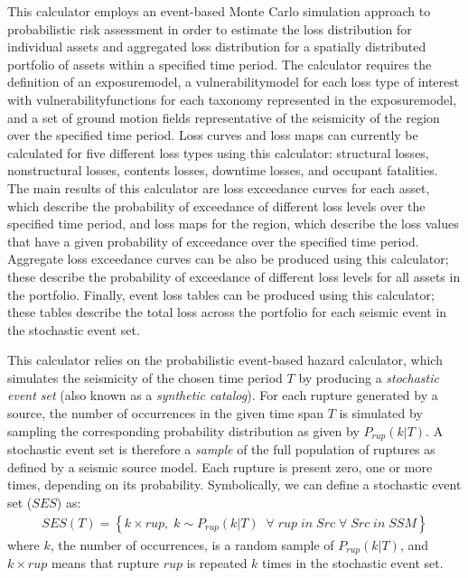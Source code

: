 This calculator employs an event-based Monte Carlo simulation approach to
probabilistic risk assessment in order to estimate the loss distribution for
individual assets and aggregated loss distribution for a spatially distributed
portfolio of assets within a specified time period. The calculator requires
the definition of an \gls{exposuremodel}, a \gls{vulnerabilitymodel} for each loss type
of interest with \glspl{vulnerabilityfunction} for each taxonomy represented in the
\gls{exposuremodel}, and a set of ground motion fields representative of the
seismicity of the region over the specified time period. Loss curves and loss
maps can currently be calculated for five different loss types using this
calculator: structural losses, nonstructural losses, contents losses, downtime
losses, and occupant fatalities. The main results of this calculator are loss
exceedance curves for each asset, which describe the probability of exceedance
of different loss levels over the specified time period, and loss maps for the
region, which describe the loss values that have a given probability of
exceedance over the specified time period. Aggregate loss exceedance curves
can be also be produced using this calculator; these describe the probability
of exceedance of different loss levels for all assets in the portfolio. Finally,
event loss tables can be produced using this calculator; these tables describe
the total loss across the portfolio for each seismic event in the stochastic
event set.

This calculator relies on the probabilistic event-based hazard calculator,
which simulates the seismicity of the chosen time period $T$ by producing a
\textit{stochastic event set} (also known as a \textit{synthetic catalog}).
For each rupture generated by a source, the number of occurrences in the given
time span $T$ is simulated by sampling the corresponding probability
distribution as given by $P_{rup}(k | T)$. A stochastic event set is therefore
a \textit{sample} of the full population of ruptures as defined by a seismic
source model. Each rupture is present zero, one or more times, depending on
its probability. Symbolically, we can define a stochastic event set ($SES$)
as:
\begin{align}
SES(T) = \left\{k \times rup,\;k\sim P_{rup}(k | T)\;\;\forall\;rup\;in\;Src\;\forall\;Src\;in\;SSM\right\}
\end{align}
where $k$, the number of occurrences, is a random sample of $P_{rup}(k | T)$,
and $k \times rup$ means that rupture $rup$ is repeated $k$ times in the
stochastic event set.

